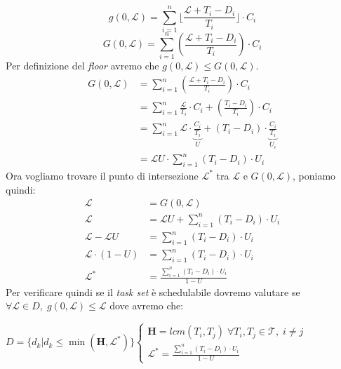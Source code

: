\[g(0, \mathcal{L}) = \sum_{i=1}^n \lfloor \frac{\mathcal{L} + T_i - D_i}{T_i} \rfloor \cdot C_i\]
\[G(0, \mathcal{L}) = \sum_{i=1}^n (\frac{\mathcal{L} + T_i - D_i}{T_i})  \cdot C_i\]
Per definizione del \textit{floor} avremo che $g(0, \mathcal{L}) \leq G(0, \mathcal{L})$.
\begin{equation}
    \begin{alignedat}{2}
        G(0, \mathcal{L}) &= \sum_{i=1}^n (\frac{\mathcal{L} + T_i - D_i}{T_i}) \cdot C_i \\
        &= \sum_{i=1}^n \frac{\mathcal{L}}{T_i} \cdot C_i + (\frac{T_i - D_i}{T_i}) \cdot C_i \\
        &= \sum_{i=1}^n \mathcal{L} \cdot \underbrace{\frac{C_i}{T_i}}_{U} + (T_i - D_i) \cdot \underbrace{\frac{C_i}{T_i}}_{U_i} \\
        &= \mathcal{L}U \cdot \sum_{i=1}^n (T_i - D_i) \cdot U_i
    \end{alignedat}
\end{equation}
Ora vogliamo trovare il punto di intersezione $\mathcal{L}^*$ tra $\mathcal{L}$ e $G(0, \mathcal{L})$, poniamo quindi: 
\begin{equation}
    \begin{alignedat}{2}
        \mathcal{L} &= G(0, \mathcal{L}) \\
        \mathcal{L} &= \mathcal{L}U + \sum_{i=1}^n (T_i - D_i) \cdot U_i \\
        \mathcal{L} - \mathcal{L}U &= \sum_{i=1}^n (T_i - D_i) \cdot U_i \\
        \mathcal{L} \cdot (1 - U) &= \sum_{i=1}^n (T_i - D_i) \cdot U_i \\
        \mathcal{L}^* &= \frac{\sum_{i=1}^n (T_i - D_i) \cdot U_i}{1 - U}
    \end{alignedat}
\end{equation}
Per verificare quindi se il \textit{task set} è schedulabile dovremo valutare se $\forall \mathcal{L} \in D, \; g(0, \mathcal{L}) \leq \mathcal{L}$ dove avremo che:
\begin{center}
    \begin{math}
        D = \{d_k | d_k \leq \min (\mathbf{H}, \mathcal{L}^*)\}
        \begin{cases}
            \mathbf{H} = lcm(T_i, T_j) \; \forall T_i,T_j \in \mathcal{T}, \; i \neq j \\
            \mathcal{L}^* = \frac{\sum_{i=1}^n (T_i - D_i) \cdot U_i}{1 - U}
        \end{cases}
    \end{math}
\end{center}
